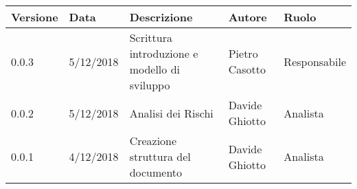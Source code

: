 \begin{tabularx}{\textwidth}{|X|X|X|X|X|}
				\hline
						\textbf{Versione} & \textbf{Data} & \textbf{Descrizione} & \textbf{Autore} & \textbf{Ruolo}\\
				\hline
						0.0.3 & 5/12/2018 & Scrittura introduzione e modello di sviluppo & Pietro Casotto & Responsabile \\
				\hline
						0.0.2 & 5/12/2018 & Analisi dei Rischi & Davide Ghiotto & Analista \\
				\hline
						0.0.1 & 4/12/2018 & Creazione struttura del documento & Davide Ghiotto & Analista  \\
				\hline
		\end{tabularx}
	\newpage